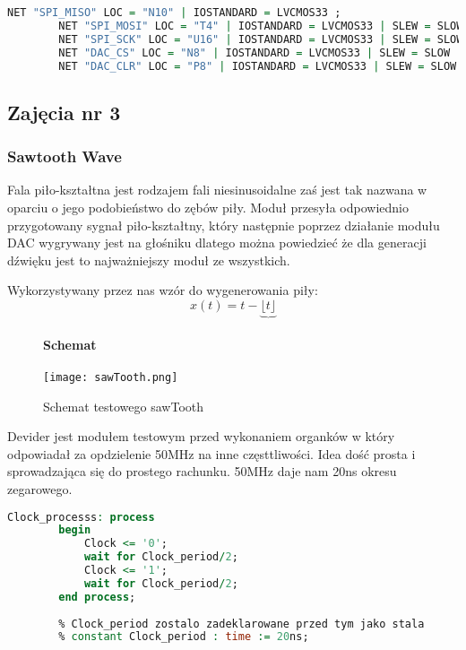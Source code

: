 \documentclass[11pt]{report}
\begin{document}
    \begin{lstlisting}[label=UCF Location Constraints,caption=UCF Location Constraints,frame=tb,language=vhdl]
        NET "SPI_MISO" LOC = "N10" | IOSTANDARD = LVCMOS33 ;
        NET "SPI_MOSI" LOC = "T4" | IOSTANDARD = LVCMOS33 | SLEW = SLOW | DRIVE = 8 ;
        NET "SPI_SCK" LOC = "U16" | IOSTANDARD = LVCMOS33 | SLEW = SLOW | DRIVE = 8 ;
        NET "DAC_CS" LOC = "N8" | IOSTANDARD = LVCMOS33 | SLEW = SLOW | DRIVE = 8 ;
        NET "DAC_CLR" LOC = "P8" | IOSTANDARD = LVCMOS33 | SLEW = SLOW | DRIVE = 8 ;
    \end{lstlisting}
    \newpage
    
    
\subsection{Zajęcia nr 3}

\subsubsection{Sawtooth Wave}
	
	Fala piło-kształtna jest rodzajem fali niesinusoidalne zaś jest tak nazwana w oparciu o jego podobieństwo do zębów piły. Moduł przesyła odpowiednio przygotowany sygnał piło-kształtny, który następnie poprzez działanie modułu DAC wygrywany jest na głośniku dlatego można powiedzieć że dla generacji dźwięku jest to najważniejszy moduł ze wszystkich. 
	
    Wykorzystywany przez nas wzór do wygenerowania piły:
$$x(t)=t-\underbrace{\lfloor t\rfloor}$$


\begin{figure}[h]
    \paragraph{Schemat}
    	\centering
    	\texttt{[image: sawTooth.png]}
    	\caption{Schemat testowego sawTooth }
	    \label{fig:ps2}
\end{figure}

	Devider jest modułem testowym przed wykonaniem organków w który odpowiadał za opdzielenie 50MHz na inne częsttliwości. Idea dość prosta i sprowadzająca się do prostego rachunku. 50MHz daje nam 20ns okresu zegarowego.

\begin{lstlisting}[label=Clock_processs,caption= Clock\_processs w module Divider,frame=tb,language=vhdl]
      Clock_processs: process
    	begin
    		Clock <= '0';
    		wait for Clock_period/2;
    		Clock <= '1';
    		wait for Clock_period/2;
    	end process;
    	
    	% Clock_period zostalo zadeklarowane przed tym jako stala 
    	% constant Clock_period : time := 20ns;
    \end{lstlisting}
    
\end{document}
